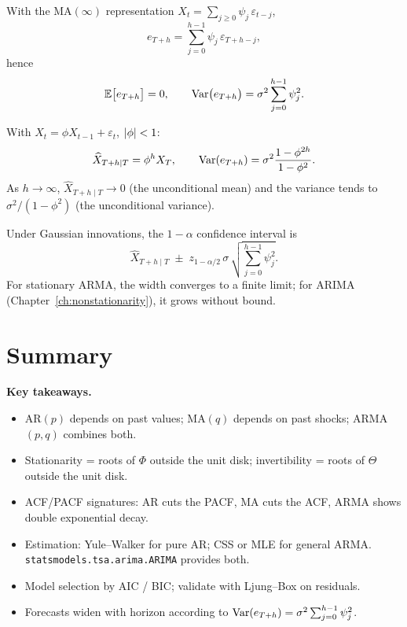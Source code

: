 \begin{propbox}
\label{prop:forecast-var}
With the MA$(\infty)$ representation
$X_t = \sum_{j \geq 0} \psi_j\, \varepsilon_{t - j}$,
\[
  e_{T + h} = \sum_{j = 0}^{h - 1} \psi_j\, \varepsilon_{T + h - j},
\]
hence
\[
  \mathbb{E}\bigl[e_{T + h}\bigr] = 0,
  \qquad
  \mathrm{Var}\bigl(e_{T + h}\bigr)
  = \sigma^2 \sum_{j = 0}^{h - 1} \psi_j^2.
\]
\end{propbox}

\begin{exbox}
With $X_t = \phi X_{t-1} + \varepsilon_t$, $\left\lvert \phi \right\rvert < 1$:
\[
  \widehat X_{T + h \mid T} = \phi^h X_T,
  \qquad
  \mathrm{Var}(e_{T + h}) = \sigma^2 \frac{1 - \phi^{2h}}{1 - \phi^2}.
\]
As $h \to \infty$, $\widehat X_{T + h \mid T} \to 0$ (the
unconditional mean) and the variance tends to
$\sigma^2 / (1 - \phi^2)$ (the unconditional variance).
\end{exbox}

\begin{rembox}
Under Gaussian innovations, the $1 - \alpha$ confidence interval is
\[
  \widehat X_{T + h \mid T}
  \;\pm\; z_{1 - \alpha / 2}\, \sigma\,
        \sqrt{\sum_{j = 0}^{h - 1} \psi_j^2}.
\]
For stationary ARMA, the width converges to a finite limit; for
ARIMA (Chapter~\ref{ch:nonstationarity}), it grows without bound.
\end{rembox}

\section*{Summary}

\noindent\textbf{Key takeaways.}
\begin{itemize}
  \item AR$(p)$ depends on past values; MA$(q)$ depends on past
        shocks; ARMA$(p, q)$ combines both.
  \item Stationarity = roots of $\Phi$ outside the unit disk;
        invertibility = roots of $\Theta$ outside the unit disk.
  \item ACF/PACF signatures: AR cuts the PACF, MA cuts the ACF,
        ARMA shows double exponential decay.
  \item Estimation: Yule--Walker for pure AR; CSS or MLE for
        general ARMA. \texttt{statsmodels.tsa.arima.ARIMA} provides
        both.
  \item Model selection by AIC / BIC; validate with Ljung--Box on
        residuals.
  \item Forecasts widen with horizon according to
        $\mathrm{Var}(e_{T + h}) = \sigma^2 \sum_{j = 0}^{h - 1} \psi_j^2$.
\end{itemize}
